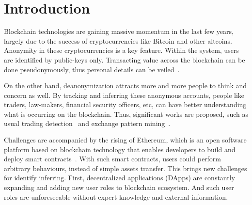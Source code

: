 \section{Introduction}
Blockchain technologies are gaining massive momentum in the last few years, largely due to the success of cryptocurrencies like Bitcoin and other altcoins. Anonymity in these cryptocurrencies is a key feature. Within the system, users are identified by public-keys only. Transacting value across the blockchain can be done pseudonymously, thus personal details can be veiled~\cite{reid2013analysis}.

On the other hand, deanonymization attracts more and more people to think and concern as well. By tracking and inferring these anonymous accounts, people like traders, law-makers, financial security officers, etc, can have better understanding what is occurring on the blockchain. Thus, significant works are proposed, such as usual trading detection~\cite{maesa2016analysis} and exchange pattern mining~\cite{ranshous2017exchange}. 

Challenges are accompanied by the rising of Ethereum, which is an open software platform based on blockchain technology that enables developers to build and deploy smart contracts~\cite{buterin2013ethereum}.
With such smart contracts, users could perform arbitrary behaviours, instead of simple assets transfer. This brings new challenges for identify inferring. First, decentralized applications (DApps) are constantly expanding and adding new user roles to blockchain ecosystem. And such user roles are unforeseeable without expert knowledge and external information.

